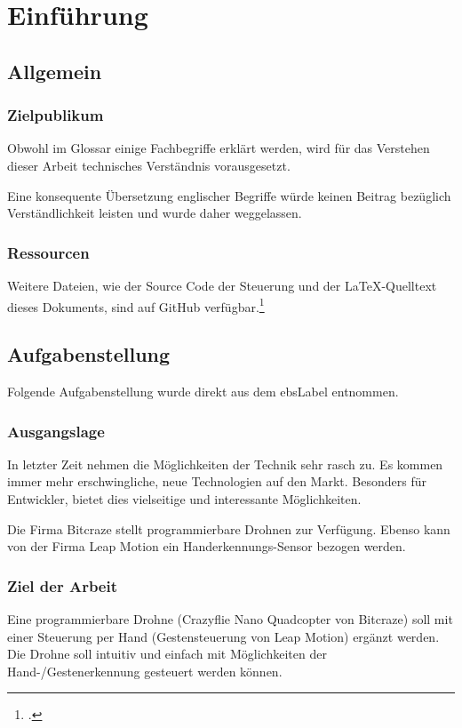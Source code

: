 \chapter{Einführung}

\section{Allgemein}

\subsection{Zielpublikum}
Obwohl im Glossar einige Fachbegriffe erklärt werden, wird für das Verstehen dieser Arbeit technisches Verständnis vorausgesetzt.

Eine konsequente Übersetzung englischer Begriffe würde keinen Beitrag bezüglich Verständlichkeit leisten und wurde daher weggelassen.

\subsection{Ressourcen}
Weitere Dateien, wie der Source Code der Steuerung und der \LaTeX-Quelltext dieses Dokuments, sind auf GitHub verfügbar.\footcite{github_droneGestures_2015-05-01}


\section{Aufgabenstellung}
Folgende Aufgabenstellung wurde direkt aus dem \gls{ebsLabel} entnommen.

\subsection{Ausgangslage}
In letzter Zeit nehmen die Möglichkeiten der Technik sehr rasch zu. Es kommen immer mehr erschwingliche, neue Technologien auf den Markt. Besonders für Entwickler, bietet dies vielseitige und interessante Möglichkeiten.

Die Firma Bitcraze stellt programmierbare Drohnen zur Verfügung. Ebenso kann von der Firma Leap Motion ein Handerkennungs-Sensor bezogen werden.

\subsection{Ziel der Arbeit}
Eine programmierbare Drohne (Crazyflie Nano Quadcopter von Bitcraze) soll mit einer Steuerung per Hand (Gestensteuerung von Leap Motion) ergänzt werden.
Die Drohne soll intuitiv und einfach mit Möglichkeiten der Hand-/Gestenerkennung gesteuert werden können.

